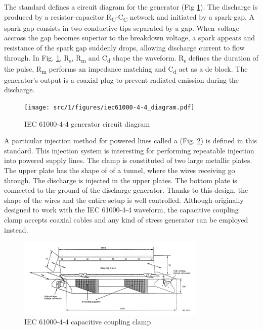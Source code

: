 The standard defines a circuit diagram for the generator (Fig \ref{fig:iec_4_4_generator}).
The discharge is produced by a resistor-capacitor R\textsubscript{C}-C\textsubscript{C} network and initiated by a spark-gap.
A spark-gap consists in two conductive tips separated by a gap.
When voltage accross the gap becomes superior to the breakdown voltage, a spark appears and resistance of the spark gap suddenly drops, allowing discharge current to flow through.
In Fig. \ref{fig:iec_4_4_generator}, R\textsubscript{s}, R\textsubscript{m} and C\textsubscript{d} shape the waveform.
R\textsubscript{s} defines the duration of the pulse, R\textsubscript{m} performs an impedance matching and C\textsubscript{d} act as a \gls{dc} block.
The generator's output is a coaxial plug to prevent radiated emission during the discharge.

\begin{figure}[!h]
  \centering
  \texttt{[image: src/1/figures/iec61000-4-4\_diagram.pdf]}
  \caption{IEC 61000-4-4 generator circuit diagram}
  \label{fig:iec_4_4_generator}
\end{figure}

A particular injection method for powered lines called a  (Fig. \ref{fig:iec_4_4_clamp}) is defined in this standard.
This injection system is interesting for performing repeatable injection into powered supply lines.
The clamp is constituted of two large metallic plates.
The upper plate has the shape of of a tunnel, where the wires receiving go through.
The discharge is injected in the upper plates.
The bottom plate is connected to the ground of the discharge generator.
Thanks to this design, the shape of the wires and the entire setup is well controlled.
Although originally designed to work with the IEC 61000-4-4 waveform, the capacitive coupling clamp accepts coaxial cables and any kind of stress generator can be employed instead.

\begin{figure}[!h]
  \centering
  \includegraphics[width=0.8\textwidth]{src/1/figures/iec61000-4-4_clamp.png}
  \caption{IEC 61000-4-4 capacitive coupling clamp}
  \label{fig:iec_4_4_clamp}
\end{figure}

